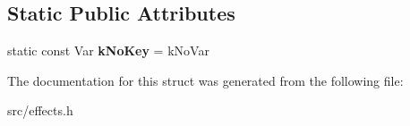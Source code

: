 \subsection*{Static Public Attributes}
\begin{DoxyCompactItemize}
\item 
\hypertarget{structv8_1_1internal_1_1_effects_base_1_1_splay_tree_config_a082d5b7800fc46e7001c0ee335838b37}{}static const Var {\bfseries k\+No\+Key} = k\+No\+Var\label{structv8_1_1internal_1_1_effects_base_1_1_splay_tree_config_a082d5b7800fc46e7001c0ee335838b37}

\end{DoxyCompactItemize}


The documentation for this struct was generated from the following file\+:\begin{DoxyCompactItemize}
\item 
src/effects.\+h\end{DoxyCompactItemize}
